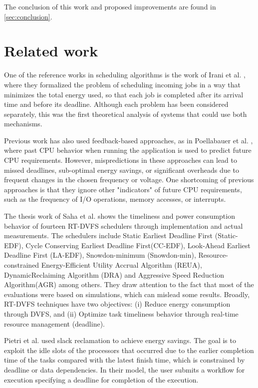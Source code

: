 The conclusion of this work and proposed improvements are found in \cref{sec:conclusion}.

\section{Related work} \label{sec:phases_related_work}

One of the reference works in scheduling algorithms is the work of Irani et al. \cite{Irani2007}, where they formalized the problem of scheduling incoming jobs in a way that minimizes the total energy used, so that each job is completed after its arrival time and before its deadline. Although each problem has been considered separately, this was the first theoretical analysis of systems that could use both mechanisms.

Previous work has also used feedback-based approaches, as in Poellabauer et al. \cite{Poellabauer2005}, where past CPU behavior when running the application is used to predict future  CPU  requirements. However, mispredictions in these approaches can lead to missed deadlines,  sub-optimal energy savings,  or significant overheads due to frequent changes in the chosen frequency or voltage. One shortcoming of previous approaches is that they ignore other "indicators" of future CPU requirements, such as the frequency of I/O operations, memory accesses, or interrupts.

The thesis work of Saha et al. \cite{Saha2012} shows the timeliness and power consumption behavior of fourteen RT-DVFS schedulers through implementation and actual measurements. The schedulers include Static Earliest Deadline First (Static-EDF), Cycle Conserving Earliest Deadline First(CC-EDF), Look-Ahead Earliest Deadline First (LA-EDF), Snowdon-minimum (Snowdon-min), Resource-constrained Energy-Efficient Utility Accrual Algorithm (REUA), DynamicReclaiming Algorithm (DRA) and Aggressive Speed Reduction Algorithm(AGR) among others. They draw attention to the fact that most of the evaluations were based on simulations, which can mislead some results. Broadly, RT-DVFS techniques have two objectives: (i) Reduce energy consumption through DVFS, and (ii) Optimize task timeliness behavior through real-time resource management (deadline).

Pietri et al. \cite{Pietri2014} used slack reclamation to achieve energy savings. The goal is to exploit the idle slots of the processors that occurred due to the earlier completion time of the tasks compared with the latest finish time, which is constrained by deadline or data dependencies. In their model, the user submits a workflow for execution specifying a deadline for completion of the execution.

